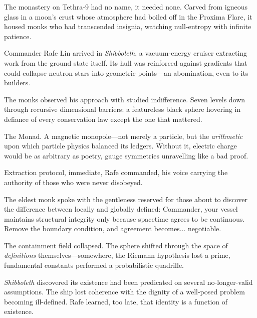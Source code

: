 \begin{tcolorbox}[colback=gray!5,colframe=gray!40,boxrule=0.5pt,arc=3pt,boxsep=10pt,left=8pt,right=8pt,top=8pt,bottom=8pt]

The monastery on Tethra-9 had no name, it needed none. Carved from igneous glass in a moon's crust whose atmosphere had boiled off in the Proxima Flare, it housed monks who had transcended insignia, watching null-entropy with infinite patience.

\medskip

Commander Rafe Lin arrived in \emph{Shibboleth}, a vacuum-energy cruiser extracting work from the ground state itself. Its hull was reinforced against gradients that could collapse neutron stars into geometric points—an abomination, even to its builders.

\medskip

The monks observed his approach with studied indifference. Seven levels down through recursive dimensional barriers: a featureless black sphere hovering in defiance of every conservation law except the one that mattered.

\medskip

The Monad. A magnetic monopole—not merely a particle, but the \emph{arithmetic} upon which particle physics balanced its ledgers. Without it, electric charge would be as arbitrary as poetry, gauge symmetries unravelling like a bad proof.

\medskip

\QENOpen{}Extraction protocol, immediate,\QENClose{} Rafe commanded, his voice carrying the authority of those who were never disobeyed.

\medskip

The eldest monk spoke with the gentleness reserved for those about to discover the difference between locally and globally defined: \QENOpen{}Commander, your vessel maintains structural integrity only because spacetime agrees to be continuous. Remove the boundary condition, and agreement becomes... negotiable.\QENClose{}

\medskip

The containment field collapsed. The sphere shifted through the space of \emph{definitions} themselves—somewhere, the Riemann hypothesis lost a prime, fundamental constants performed a probabilistic quadrille.

\medskip

\emph{Shibboleth} discovered its existence had been predicated on several no-longer-valid assumptions. The ship lost coherence with the dignity of a well-posed problem becoming ill-defined. Rafe learned, too late, that identity is a function of existence.



\end{tcolorbox}
